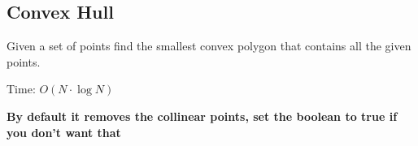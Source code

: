 \subsection{Convex Hull}

Given a set of points find the smallest convex polygon that contains all the given points.

Time: $O(N \cdot \log{N})$

\textbf{By default it removes the collinear points, set the boolean to true if you don't want that}